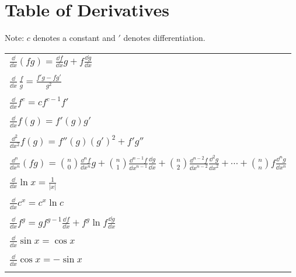 \raggedbottom
\chapter{Table of Derivatives}
\label{table_of_derivatives}
\raggedbottom 


Note: $c$ denotes a constant and $'$ denotes differentiation.

\setlongtables
\begin{longtable}{l}
  $\displaystyle \frac{\dd}{\dd x} (f g) = \frac{\dd f}{\dd x} g + f \frac{\dd g}{\dd x}$\\
  \\
  $\displaystyle \frac{\dd}{\dd x} \, \frac{f}{g}
  = \frac{f' g - f g'}{g^2}$ \\
  \\
  $\displaystyle \frac{\dd}{\dd x} f^c = c f^{c-1}f'$ \\
  \\
  $\displaystyle \frac{\dd}{\dd x} f(g) = f'(g) g'$ \\
  \\
  $\displaystyle \frac{\dd^2}{\dd x^2} f(g) = f''(g) (g')^2 + f' g''$ \\
  \\
  $\displaystyle \frac{\dd^n}{\dd x^n}(f g) 
  = \binom{n}{0} \frac{\dd^n f}{\dd x^n} g + 
  \binom{n}{1} \frac{\dd^{n-1} f}{\dd x^{n-1}} \frac{\dd g}{\dd x} + 
  \binom{n}{2} \frac{\dd^{n-2} f}{\dd x^{n-2}} \frac{\dd^2 g}{\dd x^2} + \cdots + 
  \binom{n}{n} f \frac{\dd^n g}{\dd x^n}$ \\
  \\
  $\displaystyle \frac{\dd}{\dd x} \ln x = \frac{1}{|x|}$ \\
  \\
  $\displaystyle \frac{\dd}{\dd x} c^x = c^x \ln c$ \\
  \\
  $\displaystyle \frac{\dd}{\dd x} f^g = g f^{g-1} \frac{\dd f}{\dd x}
  + f^g \ln f \frac{\dd g}{\dd x}$ \\
  \\
  $\displaystyle \frac{\dd}{\dd x} \sin x = \cos x$ \\
  \\
  $\displaystyle \frac{\dd}{\dd x} \cos x = - \sin x$ \\
  \\

\end{longtable}
